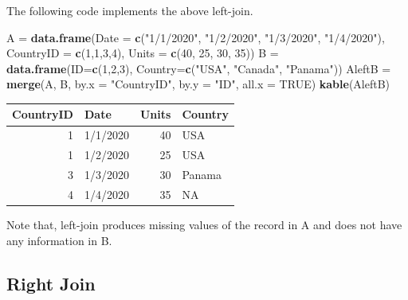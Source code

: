 \documentclass[
]{book}
\newenvironment{Shaded}{\begin{snugshade}}{\end{snugshade}}
\newcommand{\AttributeTok}[1]{\textcolor[rgb]{0.13,0.29,0.53}{#1}}
\newcommand{\ConstantTok}[1]{\textcolor[rgb]{0.56,0.35,0.01}{#1}}
\newcommand{\DecValTok}[1]{\textcolor[rgb]{0.00,0.00,0.81}{#1}}
\newcommand{\FunctionTok}[1]{\textcolor[rgb]{0.13,0.29,0.53}{\textbf{#1}}}
\newcommand{\NormalTok}[1]{#1}
\newcommand{\OtherTok}[1]{\textcolor[rgb]{0.56,0.35,0.01}{#1}}
\newcommand{\StringTok}[1]{\textcolor[rgb]{0.31,0.60,0.02}{#1}}
\begin{document}
The following code implements the above left-join.

\begin{Shaded}
\begin{Highlighting}[]
\NormalTok{A }\OtherTok{=} \FunctionTok{data.frame}\NormalTok{(}\AttributeTok{Date =} \FunctionTok{c}\NormalTok{(}\StringTok{"1/1/2020"}\NormalTok{, }\StringTok{"1/2/2020"}\NormalTok{, }\StringTok{"1/3/2020"}\NormalTok{, }\StringTok{"1/4/2020"}\NormalTok{),}
               \AttributeTok{CountryID =} \FunctionTok{c}\NormalTok{(}\DecValTok{1}\NormalTok{,}\DecValTok{1}\NormalTok{,}\DecValTok{3}\NormalTok{,}\DecValTok{4}\NormalTok{),}
               \AttributeTok{Units =} \FunctionTok{c}\NormalTok{(}\DecValTok{40}\NormalTok{, }\DecValTok{25}\NormalTok{, }\DecValTok{30}\NormalTok{, }\DecValTok{35}\NormalTok{))}
\NormalTok{B }\OtherTok{=} \FunctionTok{data.frame}\NormalTok{(}\AttributeTok{ID=}\FunctionTok{c}\NormalTok{(}\DecValTok{1}\NormalTok{,}\DecValTok{2}\NormalTok{,}\DecValTok{3}\NormalTok{),}
               \AttributeTok{Country=}\FunctionTok{c}\NormalTok{(}\StringTok{"USA"}\NormalTok{, }\StringTok{"Canada"}\NormalTok{, }\StringTok{"Panama"}\NormalTok{))}
\NormalTok{AleftB }\OtherTok{=} \FunctionTok{merge}\NormalTok{(A, B, }\AttributeTok{by.x =} \StringTok{"CountryID"}\NormalTok{, }\AttributeTok{by.y =} \StringTok{"ID"}\NormalTok{, }\AttributeTok{all.x =} \ConstantTok{TRUE}\NormalTok{)}
\FunctionTok{kable}\NormalTok{(AleftB)}
\end{Highlighting}
\end{Shaded}

\begin{tabular}{r|l|r|l}
\hline
CountryID & Date & Units & Country\\
\hline
1 & 1/1/2020 & 40 & USA\\
\hline
1 & 1/2/2020 & 25 & USA\\
\hline
3 & 1/3/2020 & 30 & Panama\\
\hline
4 & 1/4/2020 & 35 & NA\\
\hline
\end{tabular}

Note that, left-join produces missing values of the record in A and does not have any information in B.

\hfill\break

\hypertarget{right-join}{%
\subsection{Right Join}\label{right-join}}
\end{document}

